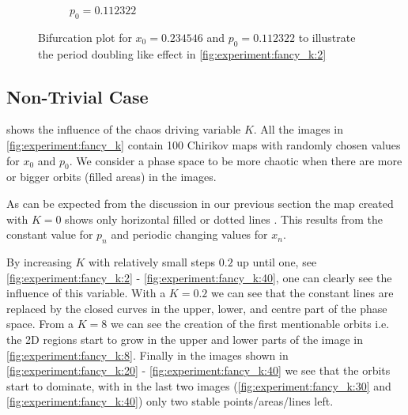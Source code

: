 \begin{figure}[h!]
\begin{subfigure}{\columnwidth}
			\caption{$p_0 = \num{0.112322}$}
			\label{fig:experiment:bifurcation:p}
	\end{subfigure}
	\caption{Bifurcation plot for $x_0 = \num{0.234546}$ and $p_0 = \num{0.112322}$ to illustrate the period doubling like effect in \cref{fig:experiment:fancy_k:2}}
	\label{fig:experiment:bifurcation}
\end{figure}

\subsection{Non-Trivial Case}
\label{ss:b:nontrivial}
 shows the influence of the chaos driving variable $K$. All the images in \cref{fig:experiment:fancy_k} contain 100 Chirikov maps with randomly chosen values for $x_0$ and $p_0$. We consider a phase space to be more chaotic when there are more or bigger orbits (filled areas) in the images. 

As can be expected from the discussion in our previous section the map created with $K = 0$ shows only horizontal filled or dotted lines . This results from the constant value for $p_n$ and periodic changing values for $x_n$. 

By increasing $K$ with relatively small steps $0.2$ up until one, see \cref{fig:experiment:fancy_k:2} - \ref{fig:experiment:fancy_k:40}, one can clearly see the influence of this variable. With a $K = 0.2$ we can see that the constant lines are replaced by the closed curves in the upper, lower, and centre part of the phase space. From a $K = 8$ we can see the creation of the first mentionable orbits i.e. the 2D regions start to grow in the upper and lower parts of the image in \cref{fig:experiment:fancy_k:8}.  Finally in the images shown in \cref{fig:experiment:fancy_k:20} - \ref{fig:experiment:fancy_k:40} we see that the orbits start to dominate, with in the last two images (\cref{fig:experiment:fancy_k:30} and \ref{fig:experiment:fancy_k:40}) only two stable points/areas/lines left. 




